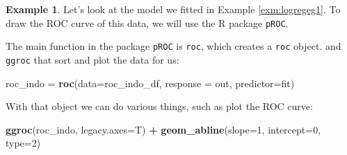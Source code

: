 \documentclass[
  openany]{book}
\newenvironment{Shaded}{\begin{snugshade}}{\end{snugshade}}
\newcommand{\AttributeTok}[1]{\textcolor[rgb]{0.13,0.29,0.53}{#1}}
\newcommand{\CommentTok}[1]{\textcolor[rgb]{0.56,0.35,0.01}{\textit{#1}}}
\newcommand{\DecValTok}[1]{\textcolor[rgb]{0.00,0.00,0.81}{#1}}
\newcommand{\FunctionTok}[1]{\textcolor[rgb]{0.13,0.29,0.53}{\textbf{#1}}}
\newcommand{\NormalTok}[1]{#1}
\newcommand{\OtherTok}[1]{\textcolor[rgb]{0.56,0.35,0.01}{#1}}
\newcommand{\SpecialCharTok}[1]{\textcolor[rgb]{0.81,0.36,0.00}{\textbf{#1}}}
\theoremstyle{definition}
\theoremstyle{definition}
\newtheorem{example}{Example}[chapter]
\theoremstyle{definition}
\theoremstyle{definition}
\theoremstyle{remark}
\begin{document}
\begin{example}
Let's look at the model we fitted in Example \ref{exm:logregeg1}. To draw the ROC curve of this data, we will use the R package \texttt{pROC}.

\begin{Shaded}
\end{Shaded}

The main function in the package \texttt{pROC} is \texttt{roc}, which creates a \texttt{roc} object. and \texttt{ggroc} that sort and plot the data for us:

\begin{Shaded}
\begin{Highlighting}[]
\NormalTok{roc\_indo }\OtherTok{=} \FunctionTok{roc}\NormalTok{(}\AttributeTok{data=}\NormalTok{roc\_indo\_df, }\AttributeTok{response =}\NormalTok{ out, }\AttributeTok{predictor=}\NormalTok{fit)}
\end{Highlighting}
\end{Shaded}

With that object we can do various things, such as plot the ROC curve:

\begin{Shaded}
\begin{Highlighting}[]
\FunctionTok{ggroc}\NormalTok{(roc\_indo, }\AttributeTok{legacy.axes=}\NormalTok{T) }\SpecialCharTok{+} \FunctionTok{geom\_abline}\NormalTok{(}\AttributeTok{slope=}\DecValTok{1}\NormalTok{, }\AttributeTok{intercept=}\DecValTok{0}\NormalTok{, }\AttributeTok{type=}\DecValTok{2}\NormalTok{)}
\end{Highlighting}
\end{Shaded}


\end{example}
\end{document}
